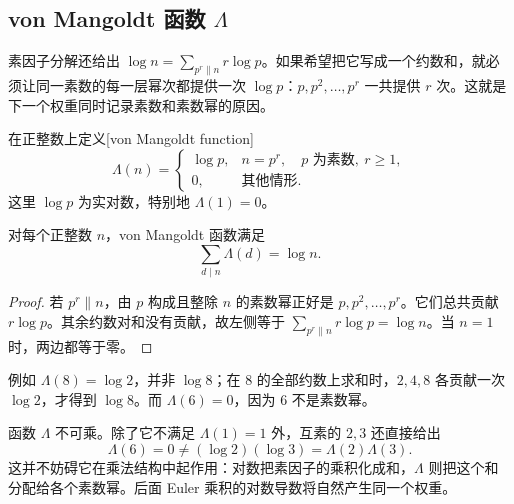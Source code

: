 \subsection{von Mangoldt 函数 \texorpdfstring{\(\Lambda\)}{\AnalysisPdfCapitalLambda}}
\label{b3:subsec:250106}

素因子分解还给出 \(\log n=\sum_{p^r\parallel n}r\log p\)。如果希望把它写成一个约数和，就必须让同一素数的每一层幂次都提供一次 \(\log p\)：\(p,p^2,\ldots,p^r\) 一共提供 \(r\) 次。这就是下一个权重同时记录素数和素数幂的原因。

\begin{definition}\label{b3:def:25-von-mangoldt}
在正整数上定义[von Mangoldt function]
\[
 \Lambda(n)=
 \begin{cases}
  \log p,&n=p^r,\quad p\text{ 为素数},\ r\ge1,\\
  0,&\text{其他情形}.
 \end{cases}
\]
这里 \(\log p\) 为实对数，特别地 \(\Lambda(1)=0\)。
\end{definition}

\begin{proposition}[对数的约数分解]
\label{b3:prop:25-mangoldt-divisors}
对每个正整数 \(n\)，von Mangoldt 函数满足
\begin{equation}\label{b3:eq:25-log-divisors}
 \sum_{d\mid n}\Lambda(d)=\log n.
\end{equation}
\end{proposition}
\begin{proof}
若 \(p^r\parallel n\)，由 \(p\) 构成且整除 \(n\) 的素数幂正好是 \(p,p^2,\ldots,p^r\)。它们总共贡献 \(r\log p\)。其余约数对和没有贡献，故左侧等于 \(\sum_{p^r\parallel n}r\log p=\log n\)。当 \(n=1\) 时，两边都等于零。
\end{proof}

例如 \(\Lambda(8)=\log2\)，并非 \(\log8\)；在 \(8\) 的全部约数上求和时，\(2,4,8\) 各贡献一次 \(\log2\)，才得到 \(\log8\)。而 \(\Lambda(6)=0\)，因为 \(6\) 不是素数幂。

函数 \(\Lambda\) 不可乘。除了它不满足 \(\Lambda(1)=1\) 外，互素的 \(2,3\) 还直接给出
\[
 \Lambda(6)=0\ne(\log2)(\log3)=\Lambda(2)\Lambda(3).
\]
这并不妨碍它在乘法结构中起作用：对数把素因子的乘积化成和，\(\Lambda\) 则把这个和分配给各个素数幂。后面 Euler 乘积的对数导数将自然产生同一个权重。